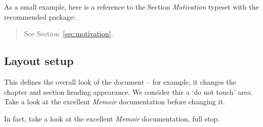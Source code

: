 As a small example, here is a reference to the Section \emph{Motivation}
typeset with the recommended  package:
\begin{quote}
  See Section~\vref{sec:motivation}.
\end{quote}


\subsection{Layout setup}

This defines the overall look of the document -- for example, it changes the chapter and section heading appearance.  We consider this a `do not touch' area.  Take a look at the excellent \emph{Memoir} documentation before changing it.

In fact, take a look at the excellent \emph{Memoir} documentation, full stop.